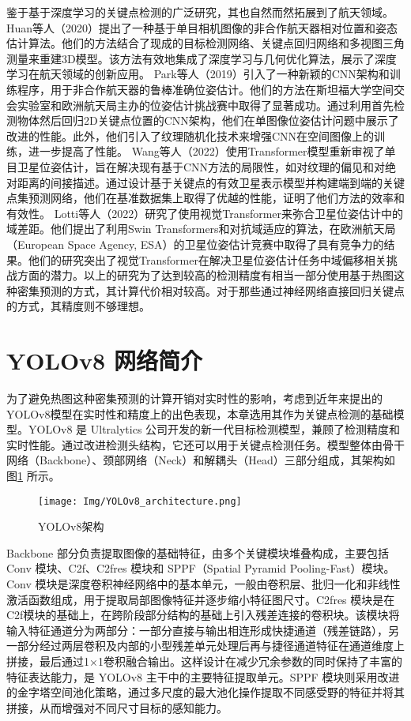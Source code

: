 鉴于基于深度学习的关键点检测的广泛研究，其也自然而然拓展到了航天领域。Huan等人（2020）提出了一种基于单目相机图像的非合作航天器相对位置和姿态估计算法\citep{huan2020pose}。他们的方法结合了现成的目标检测网络、关键点回归网络和多视图三角测量来重建3D模型。该方法有效地集成了深度学习与几何优化算法，展示了深度学习在航天领域的创新应用。
Park等人（2019）引入了一种新颖的CNN架构和训练程序，用于非合作航天器的鲁棒准确位姿估计\citep{park2019towards}。他们的方法在斯坦福大学空间交会实验室和欧洲航天局主办的位姿估计挑战赛中取得了显著成功。通过利用首先检测物体然后回归2D关键点位置的CNN架构，他们在单图像位姿估计问题中展示了改进的性能。此外，他们引入了纹理随机化技术来增强CNN在空间图像上的训练，进一步提高了性能。
Wang等人（2022）使用Transformer模型重新审视了单目卫星位姿估计，旨在解决现有基于CNN方法的局限性，如对纹理的偏见和对绝对距离的间接描述\citep{wang2022revisiting}。通过设计基于关键点的有效卫星表示模型并构建端到端的关键点集预测网络，他们在基准数据集上取得了优越的性能，证明了他们方法的效率和有效性。
Lotti等人（2022）研究了使用视觉Transformer来弥合卫星位姿估计中的域差距。他们提出了利用Swin Transformers和对抗域适应的算法，在欧洲航天局（European Space Agency, ESA）的卫星位姿估计竞赛中取得了具有竞争力的结果\citep{lotti2022investigating}。他们的研究突出了视觉Transformer在解决卫星位姿估计任务中域偏移相关挑战方面的潜力。以上的研究为了达到较高的检测精度有相当一部分使用基于热图这种密集预测的方式，其计算代价相对较高。对于那些通过神经网络直接回归关键点的方式，其精度则不够理想。



\section{YOLOv8 网络简介}
为了避免热图这种密集预测的计算开销对实时性的影响，考虑到近年来提出的YOLOv8模型在实时性和精度上的出色表现，本章选用其作为关键点检测的基础模型。YOLOv8 是 Ultralytics 公司开发的新一代目标检测模型\cite{yolov8_ultralytics}，兼顾了检测精度和实时性能。通过改进检测头结构，它还可以用于关键点检测任务。模型整体由骨干网络（Backbone）、颈部网络（Neck）和解耦头（Head）三部分组成，其架构如图\ref{fig:YOLOv8_architecture} 所示。
\begin{figure}[htbp]
	\centering
	\texttt{[image: Img/YOLOv8\_architecture.png]}
	\caption{YOLOv8架构}
	\label{fig:YOLOv8_architecture}
	\vspace{-3ex}
\end{figure}
Backbone 部分负责提取图像的基础特征，由多个关键模块堆叠构成，主要包括 Conv 模块、C2f、C2fres 模块和 SPPF（Spatial Pyramid Pooling-Fast）模块。Conv 模块是深度卷积神经网络中的基本单元，一般由卷积层、批归一化和非线性激活函数组成，用于提取局部图像特征并逐步缩小特征图尺寸。C2fres 模块是在C2f模块的基础上，在跨阶段部分结构的基础上引入残差连接的卷积块。该模块将输入特征通道分为两部分：一部分直接与输出相连形成快捷通道（残差链路），另一部分经过两层卷积及内部的小型残差单元处理后再与捷径通道特征在通道维度上拼接，最后通过1×1卷积融合输出。这样设计在减少冗余参数的同时保持了丰富的特征表达能力，是 YOLOv8 主干中的主要特征提取单元。SPPF 模块则采用改进的金字塔空间池化策略，通过多尺度的最大池化操作提取不同感受野的特征并将其拼接，从而增强对不同尺寸目标的感知能力。 


